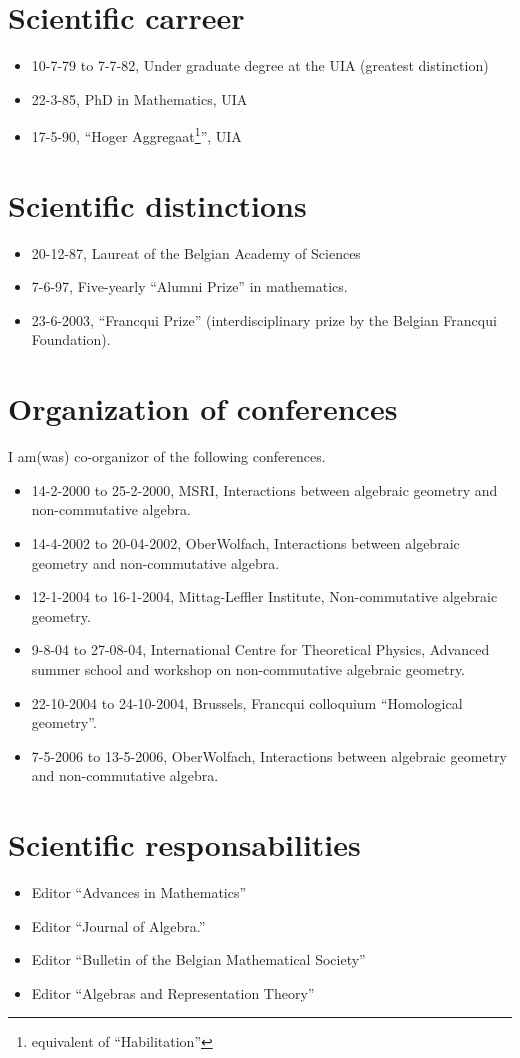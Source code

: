 \documentclass{amsart}
\begin{document}
\section*{Scientific carreer}
\begin{itemize}
\item
10-7-79 to 7-7-82, Under graduate degree at the UIA (greatest distinction)
\item
22-3-85, PhD in Mathematics, UIA
\item
17-5-90, ``Hoger Aggregaat\footnote{equivalent of ``Habilitation''}'', UIA
\end{itemize}
\section*{Scientific distinctions}
\begin{itemize}
\item
20-12-87, Laureat of the Belgian Academy of Sciences
\item 
7-6-97, Five-yearly ``Alumni Prize'' in mathematics.
\item
23-6-2003, ``Francqui Prize'' (interdisciplinary prize by the Belgian
Francqui Foundation).
\end{itemize}
\section*{Organization of conferences}
I am(was) co-organizor of the following conferences.
\begin{itemize}
\item 14-2-2000 to 25-2-2000, MSRI, Interactions between algebraic geometry
  and non-commutative algebra.
\item 14-4-2002 to 20-04-2002, OberWolfach, Interactions between
  algebraic geometry and non-commutative algebra. 
\item 12-1-2004 to 16-1-2004, Mittag-Leffler Institute, Non-commutative
algebraic geometry.
\item 9-8-04 to 27-08-04, International Centre for Theoretical
  Physics, Advanced summer school and workshop on non-commutative
  algebraic geometry.
\item 22-10-2004 to 24-10-2004, Brussels, Francqui colloquium 
``Homological geometry''.
\item 7-5-2006 to 13-5-2006, OberWolfach, Interactions between
  algebraic geometry and non-commutative algebra.
\end{itemize}
\section*{Scientific responsabilities}
\begin{itemize}
\item Editor ``Advances in Mathematics''
\item Editor ``Journal of Algebra.''
\item Editor ``Bulletin of the Belgian Mathematical Society''
\item Editor ``Algebras and Representation Theory''
\end{itemize}
\end{document}
